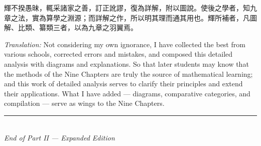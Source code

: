 \documentclass[11pt,a4paper]{article}
\newcommand{\longline}{\noindent\rule{\textwidth}{0.4pt}}
\newcommand{\zh}[1]{{#1}}
\newenvironment{chpassage}{%
  \par\medskip
  \begin{center}
  \begin{minipage}{0.95\textwidth}
  \setlength{\parindent}{2em}
  \linespread{1.3}\selectfont
}{%
  \end{minipage}
  \end{center}
  \medskip
}
\begin{document}
\begin{chpassage}
\zh{輝不揆愚昧，輒采諸家之善，訂正訛謬，復為詳解，附以圖說。使後之學者，知九章之法，實為算學之淵源；而詳解之作，所以明其理而通其用也。輝所補者，凡圖解、比類、纂類三者，以為九章之羽翼焉。}

\medskip
\textit{Translation:} Not considering my own ignorance, I have collected the
best from various schools, corrected errors and mistakes, and composed this
detailed analysis with diagrams and explanations. So that later students may
know that the methods of the Nine Chapters are truly the source of
mathematical learning; and this work of detailed analysis serves to clarify
their principles and extend their applications. What I have added ---
diagrams, comparative categories, and compilation --- serve as wings to the
Nine Chapters.
\end{chpassage}

\vspace{2cm}
\begin{center}
\longline\\[0.5cm]
{\small\textit{End of Part II --- Expanded Edition}}
\end{center}
\end{document}
